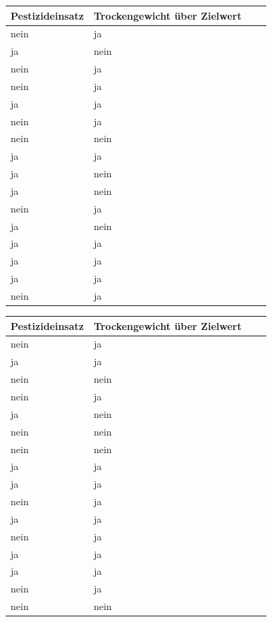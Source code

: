 \documentclass[a4paper, 9pt]{scrartcl}\usepackage[]{graphicx}\usepackage[]{xcolor}
\begin{document}
\begin{center}
\begin{minipage}[t]{0.45\textwidth}
\begin{center}

\begin{tabular}{p{2.5cm}p{2.5cm}p{2.5cm}p{2.5cm}}
\toprule
Pestizideinsatz & Trockengewicht über Zielwert\\
\midrule
nein & ja\\
ja & nein\\
nein & ja\\
nein & ja\\
ja & ja\\
\addlinespace
nein & ja\\
nein & nein\\
ja & ja\\
ja & nein\\
ja & nein\\
\addlinespace
nein & ja\\
ja & nein\\
ja & ja\\
ja & ja\\
ja & ja\\
\addlinespace
nein & ja\\
\bottomrule
\end{tabular}


\end{center}
\end{minipage}
\begin{minipage}[t]{0.45\textwidth}
\begin{center}

\begin{tabular}{p{2.5cm}p{2.5cm}p{2.5cm}p{2.5cm}}
\toprule
Pestizideinsatz & Trockengewicht über Zielwert\\
\midrule
nein & ja\\
ja & ja\\
nein & nein\\
nein & ja\\
ja & nein\\
\addlinespace
nein & nein\\
nein & nein\\
ja & ja\\
ja & ja\\
nein & ja\\
\addlinespace
ja & ja\\
nein & ja\\
ja & ja\\
ja & ja\\
nein & ja\\
\addlinespace
nein & nein\\
\bottomrule
\end{tabular}


\end{center}
\end{minipage}
\end{center}
\end{document}
